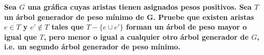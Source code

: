 \textbf{Sea $G$ una gr\'afica cuyas aristas tienen asignados pesos positivos. Sea $T$ un \'arbol generador de peso m\'inimo de G. Pruebe que existen aristas $e \in T$ y $e' \notin T$ tales que $T - \{e \cup e'\}$ forman un \'arbol de peso mayor o igual que $T$, pero menor o igual a cualquier otro \'arbol generador de $G$, i.e. un segundo \'arbol generador de peso m\'inimo.}\vspace{.2cm}

\textcolor{bibi}{}
\begin{quote}
\end{quote}